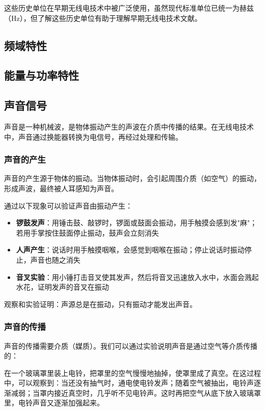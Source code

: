 \documentclass[12pt,UTF8]{ctexbook}
\begin{document}
这些历史单位在早期无线电技术中被广泛使用，虽然现代标准单位已统一为赫兹（Hz），但了解这些历史单位有助于理解早期无线电技术文献。

\subsection{频域特性}

\subsection{能量与功率特性}

\subsection{声音信号}

声音是一种机械波，是物体振动产生的声波在介质中传播的结果。在无线电技术中，声音通过换能器转换为电信号，再经过处理和传输。

\subsubsection{声音的产生}

声音的产生源于物体的振动。当物体振动时，会引起周围介质（如空气）的振动，形成声波，最终被人耳感知为声音。

通过以下现象可以验证声音由振动产生：
\begin{itemize}[leftmargin=3.5em]
    \item \textbf{锣鼓发声}：用锤击鼓、敲锣时，锣面或鼓面会振动，用手触摸会感到发"麻"；若用手掌按住鼓面停止振动，鼓声会立刻消失
    \item \textbf{人声产生}：说话时用手触摸咽喉，会感觉到咽喉在振动；停止说话时振动停止，声音也随之消失
    \item \textbf{音叉实验}：用小锤打击音叉使其发声，然后将音叉迅速放入水中，水面会溅起水花，证明发声的音叉在振动
\end{itemize}

观察和实验证明：声源总是在振动，只有振动才能发出声音。

\subsubsection{声音的传播}

声音的传播需要介质（媒质）。我们可以通过实验说明声音是通过空气等介质传播的：

在一个玻璃罩里装上电铃，把罩里的空气慢慢地抽掉，使罩里成了真空。在这过程中，可以观察到：当还没有抽气时，通电使电铃发声；随着空气被抽出，电铃声逐渐减弱；当罩内接近真空时，几乎听不见电铃声。这时再把空气从底下放入玻璃罩里，电铃声音又逐渐加强起来。
\end{document}
